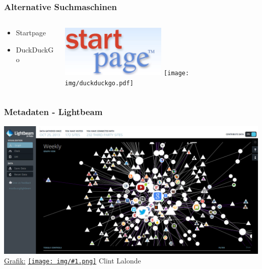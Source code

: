 \documentclass[12pt]{beamer}
\newcommand{\cc}[1]{\texttt{[image: img/\#1.png]}\hspace{1mm}}
\begin{document}
\begin{frame}
    \frametitle{Alternative Suchmaschinen}

    \begin{columns}
        \begin{column}{5cm}
            \begin{center}
                    \begin{itemize}
                            \item Startpage
                            \vspace{2cm}
                            \item DuckDuckGo
                    \end{itemize}
            \end{center}
        \end{column}
        \begin{column}{5cm}
            \begin{center}
                \includegraphics[width=0.5\textwidth]{img/startp_logo.png}
                \vspace{1cm}
                \texttt{[image: img/duckduckgo.pdf]}
            \end{center}
        \end{column}
    \end{columns}
\end{frame}

\begin{frame}
    \frametitle{Metadaten - Lightbeam}
    \begin{center}
	\includegraphics[height=0.7\textheight]{img/lightbeam.png}
	\\{\small \href{http://www.flickr.com/photos/8517757@N03/10538205035/in/photolist-h4e4dg}{Grafik:} \href{http://creativecommons.org/licenses/by-sa/3.0/deed.en}{\cc{by-sa}} Clint Lalonde}
    \end{center}
\end{frame}
\end{document}
